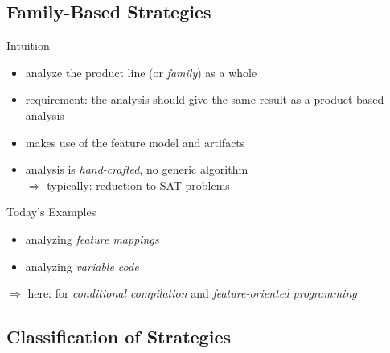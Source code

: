 \subsection{Family-Based Strategies}

\begin{frame}{\myframetitle}
	\begin{fancycolumns}
		\begin{definition}{Intuition}
			\begin{itemize}
				\item analyze the product line (or \emph{family}) as a whole
				\item requirement: the analysis should give the same result as a product-based analysis
				\item makes use of the feature model and artifacts
				\item analysis is \emph{hand-crafted}, no generic algorithm\\
				$\Rightarrow$ typically: reduction to SAT problems
			\end{itemize}
		\end{definition}
		\begin{example}{Today's Examples}
			\begin{itemize}
				\item analyzing \emph{feature mappings}
				\item analyzing \emph{variable code}
			\end{itemize}
			$\Rightarrow$ here: for \emph{conditional compilation} and \emph{feature-oriented programming}
		\end{example}
	\nextcolumn
		\centering\familybasedlego
	\end{fancycolumns}
\end{frame}

\subsection{Classification of Strategies}

\begin{frame}[label=AnalysisStrategies]{\myframetitle}
	\begin{fancycolumns}[t,columns=3,animation=none]
		\summaryproductbased
	\nextcolumn
		\summaryfeaturebased
	\nextcolumn
		\summaryfamilybased
	\end{fancycolumns}
\end{frame}